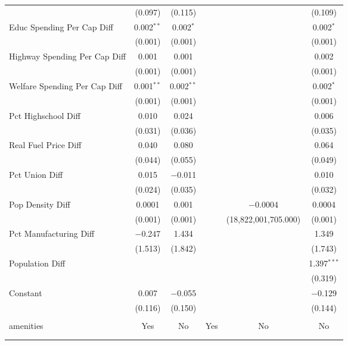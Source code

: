 \begin{table}[!htbp]
\begin{tabular}{@{\extracolsep{5pt}}lccccc}
  & (0.097) & (0.115) &  &  & (0.109) \\ 
  Educ Spending Per Cap Diff & 0.002$^{**}$ & 0.002$^{*}$ &  &  & 0.002$^{*}$ \\ 
  & (0.001) & (0.001) &  &  & (0.001) \\ 
  Highway Spending Per Cap Diff & 0.001 & 0.001 &  &  & 0.002 \\ 
  & (0.001) & (0.001) &  &  & (0.001) \\ 
  Welfare Spending Per Cap Diff & 0.001$^{**}$ & 0.002$^{**}$ &  &  & 0.002$^{*}$ \\ 
  & (0.001) & (0.001) &  &  & (0.001) \\ 
  Pct Highschool Diff & 0.010 & 0.024 &  &  & 0.006 \\ 
  & (0.031) & (0.036) &  &  & (0.035) \\ 
  Real Fuel Price Diff & 0.040 & 0.080 &  &  & 0.064 \\ 
  & (0.044) & (0.055) &  &  & (0.049) \\ 
  Pct Union Diff & 0.015 & $-$0.011 &  &  & 0.010 \\ 
  & (0.024) & (0.035) &  &  & (0.032) \\ 
  Pop Density Diff & 0.0001 & 0.001 &  & $-$0.0004 & 0.0004 \\ 
  & (0.001) & (0.001) &  & (18,822,001,705.000) & (0.001) \\ 
  Pct Manufacturing Diff & $-$0.247 & 1.434 &  &  & 1.349 \\ 
  & (1.513) & (1.842) &  &  & (1.743) \\ 
  Population Diff &  &  &  &  & 1.397$^{***}$ \\ 
  &  &  &  &  & (0.319) \\ 
  Constant & 0.007 & $-$0.055 &  &  & $-$0.129 \\ 
  & (0.116) & (0.150) &  &  & (0.144) \\ 
 \hline \\[-1.8ex] 
amenities & Yes & No & Yes & No & No \\ 
\hline \\[-1.8ex] 
\hline 
\hline \\[-1.8ex] 
\end{tabular} 
\end{table} 
